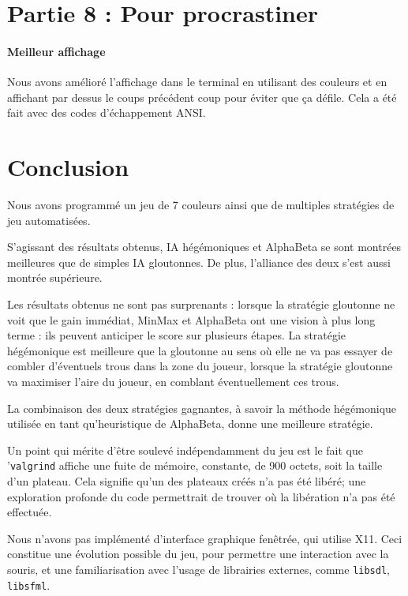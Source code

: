 \documentclass[a4paper]{article}
\begin{document}
    \section{Partie 8 : Pour procrastiner}
    \paragraph{Meilleur affichage} Nous avons amélioré l'affichage dans le
    terminal en utilisant des couleurs et en affichant par dessus le coups
    précédent coup pour éviter que ça défile. Cela a été fait avec des codes
    d'échappement ANSI.

    \section{Conclusion}
    Nous avons programmé un jeu de 7 couleurs ainsi que de multiples stratégies 
de jeu automatisées. 
    
    S'agissant des résultats obtenus, IA hégémoniques et AlphaBeta 
se sont montrées meilleures que de simples IA gloutonnes. De plus, l'alliance 
des deux s'est aussi montrée supérieure.

Les résultats obtenus ne sont pas surprenants : lorsque la stratégie gloutonne 
ne voit que le gain immédiat, MinMax et AlphaBeta ont une vision à plus long 
terme : ils peuvent anticiper le score sur plusieurs étapes. La stratégie 
hégémonique est meilleure que la gloutonne au sens où elle ne va pas essayer de 
combler d'éventuels trous dans la zone du joueur, lorsque la stratégie 
gloutonne va maximiser l'aire du joueur, en comblant éventuellement ces trous.

La combinaison des deux stratégies gagnantes, à savoir la méthode hégémonique 
utilisée en tant qu'heuristique de AlphaBeta, donne une meilleure stratégie.

Un point qui mérite d'être soulevé indépendamment du jeu est 
le fait que '\texttt{valgrind} affiche une fuite de mémoire, constante, de 900 
octets, soit la taille d'un plateau. Cela signifie qu'un des plateaux créés n'a 
pas été libéré; une exploration profonde du code permettrait de trouver où la 
libération n'a pas été effectuée.

Nous n'avons pas implémenté d'interface graphique fenêtrée, qui utilise X11. 
Ceci constitue une évolution possible du jeu, pour permettre une interaction 
avec la souris, et une familiarisation avec l'usage de librairies externes, 
comme \texttt{libsdl}, \texttt{libsfml}.

    
\end{document}
